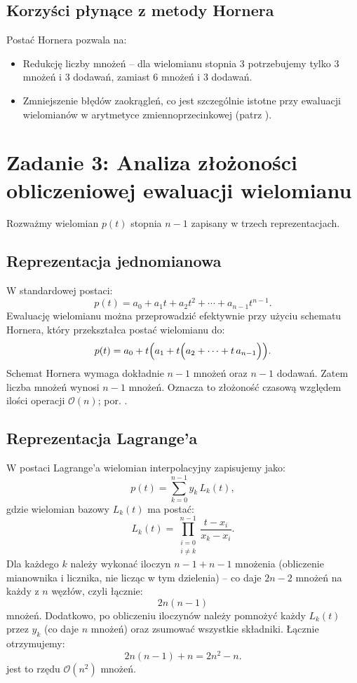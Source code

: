 \documentclass{article}
\begin{document}
\subsection{Korzyści płynące z metody Hornera}
Postać Hornera pozwala na:
\begin{itemize}
    \item Redukcję liczby mnożeń – dla wielomianu stopnia 3 potrzebujemy tylko 3 mnożeń i 3 dodawań, zamiast 6 mnożeń i 3 dodawań.
    \item Zmniejszenie błędów zaokrągleń, co jest szczególnie istotne przy ewaluacji wielomianów w arytmetyce zmiennoprzecinkowej (patrz \cite{Higham2002,Goldberg1991,Rycerz}).
\end{itemize}

\section{Zadanie 3: Analiza złożoności obliczeniowej ewaluacji wielomianu}

Rozważmy wielomian \( p(t) \) stopnia \( n-1 \) zapisany w trzech reprezentacjach.

\subsection{Reprezentacja jednomianowa}
W standardowej postaci:
\[
p(t)=a_0+a_1t+a_2t^2+\cdots+a_{n-1}t^{n-1}.
\]
Ewaluację wielomianu można przeprowadzić efektywnie przy użyciu schematu Hornera, który przekształca postać wielomianu do:
\[
p(t)=a_0+t\Bigl(a_1+t\Bigl(a_2+\cdots+t\,a_{n-1}\Bigr)\Bigr).
\]
Schemat Hornera wymaga dokładnie \( n-1 \) mnożeń oraz \( n-1 \) dodawań. Zatem liczba mnożeń wynosi $n-1$ mnożeń. Oznacza to  złożoność czasową względem ilości operacji \( \mathcal{O}(n) \); por. \cite{Higham2002}.

\subsection{Reprezentacja Lagrange’a}
W postaci Lagrange’a wielomian interpolacyjny zapisujemy jako:
\[
p(t)=\sum_{k=0}^{n-1}y_k\,L_k(t),
\]
gdzie wielomian bazowy \( L_k(t) \) ma postać:
\[
L_k(t)=\prod_{\substack{i=0 \\ i\neq k}}^{n-1}\frac{t-x_i}{x_k-x_i}.
\]
Dla każdego \( k \) należy wykonać iloczyn \( n-1 + n-1 \) mnożenia (obliczenie mianownika i licznika, nie licząc w tym dzielenia) – co daje \( 2 n- 2 \) mnożeń na każdy z \( n \) węzłów, czyli łącznie:
\[
2n(n-1)
\]
mnożeń. Dodatkowo, po obliczeniu iloczynów należy pomnożyć każdy \( L_k(t) \) przez \( y_k \) (co daje \( n \) mnożeń) oraz zsumować wszystkie składniki. Łącznie otrzymujemy:
\[
2n(n-1) + n = 2n^2 - n.
\]
jest to rzędu $\mathcal{O}(n^2)$ mnożeń.
\end{document}
